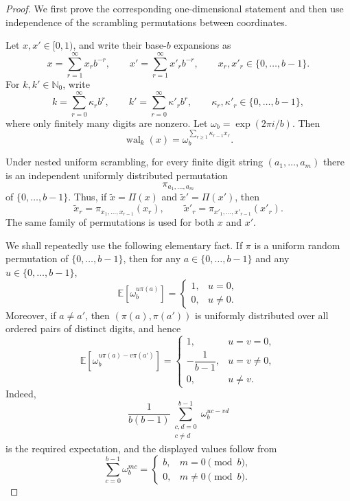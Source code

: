 \documentclass[11pt]{article}
\newcommand{\Nzero}{\mathbb N_0}
\newcommand{\wal}{\operatorname{wal}}
\begin{document}
\begin{proof}
We first prove the corresponding one-dimensional statement and then use
independence of the scrambling permutations between coordinates.

Let \(x,x'\in[0,1)\), and write their base-\(b\) expansions as
\[
 x=\sum_{r=1}^\infty x_r b^{-r},
 \qquad
 x'=\sum_{r=1}^\infty x'_r b^{-r},
 \qquad
 x_r,x'_r\in\{0,\ldots,b-1\}.
\]
For \(k,k'\in\Nzero\), write
\[
 k=\sum_{r=0}^\infty \kappa_r b^r,
 \qquad
 k'=\sum_{r=0}^\infty \kappa'_r b^r,
 \qquad
 \kappa_r,\kappa'_r\in\{0,\ldots,b-1\},
\]
where only finitely many digits are nonzero.  Let
\(\omega_b=\exp(2\pi i/b)\).  Then
\[
 \wal_k(x)
 =
 \omega_b^{\sum_{r\geq 1}\kappa_{r-1}x_r}.
\]

Under nested uniform scrambling, for every finite digit string
\((a_1,\ldots,a_m)\) there is an independent uniformly distributed
permutation
\[
 \pi_{a_1,\ldots,a_m}
\]
of \(\{0,\ldots,b-1\}\).  Thus, if
\(\widetilde x=\Pi(x)\) and \(\widetilde x'=\Pi(x')\), then
\[
 \widetilde x_r
 =
 \pi_{x_1,\ldots,x_{r-1}}(x_r),
 \qquad
 \widetilde x'_r
 =
 \pi_{x'_1,\ldots,x'_{r-1}}(x'_r).
\]
The same family of permutations is used for both \(x\) and \(x'\).

We shall repeatedly use the following elementary fact.  If \(\pi\) is a
uniform random permutation of \(\{0,\ldots,b-1\}\), then for any
\(a\in\{0,\ldots,b-1\}\) and any \(u\in\{0,\ldots,b-1\}\),
\[
 \mathbb E\!\left[\omega_b^{u\pi(a)}\right]
 =
 \begin{cases}
  1, & u=0,\\
  0, & u\neq 0.
 \end{cases}
\]
Moreover, if \(a\neq a'\), then \((\pi(a),\pi(a'))\) is uniformly
distributed over all ordered pairs of distinct digits, and hence
\begin{equation}\label{eq:perm-pair-expectation}
 \mathbb E\!\left[
   \omega_b^{u\pi(a)-v\pi(a')}
 \right]
 =
 \begin{cases}
  1, & u=v=0,\\[1mm]
  -\dfrac{1}{b-1}, & u=v\neq 0,\\[2mm]
  0, & u\neq v.
 \end{cases}
\end{equation}
Indeed,
\[
 \frac{1}{b(b-1)}
 \sum_{\substack{c,d=0\\c\neq d}}^{b-1}
 \omega_b^{uc-vd}
\]
is the required expectation, and the displayed values follow from
\[
 \sum_{c=0}^{b-1}\omega_b^{mc}
 =
 \begin{cases}
  b, & m=0\pmod b,\\
  0, & m\neq 0\pmod b.
 \end{cases}
\]


\end{proof}
\end{document}

